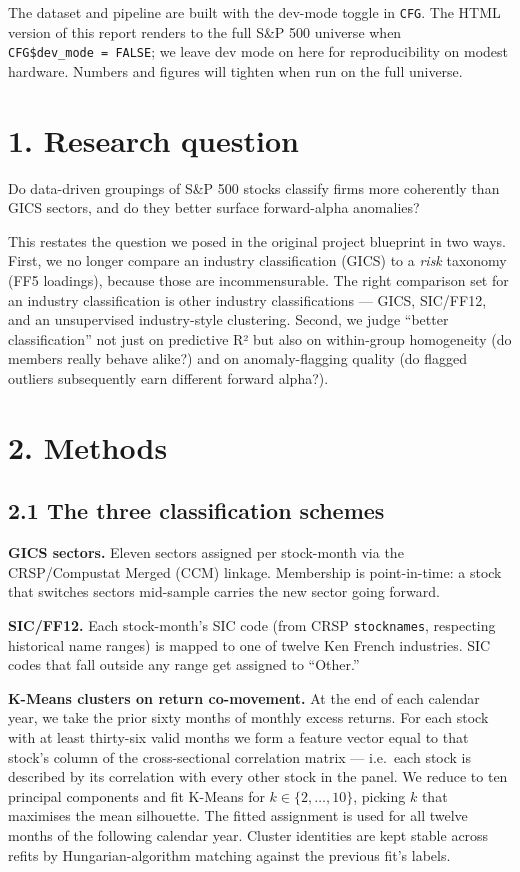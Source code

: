 \documentclass[
  letterpaper,
  DIV=11,
  numbers=noendperiod]{scrartcl}
\begin{document}
The dataset and pipeline are built with the dev-mode toggle in
\texttt{CFG}. The HTML version of this report renders to the full S\&P
500 universe when \texttt{CFG\$dev\_mode\ =\ FALSE}; we leave dev mode
on here for reproducibility on modest hardware. Numbers and figures will
tighten when run on the full universe.

\section{1. Research question}\label{research-question}

Do data-driven groupings of S\&P 500 stocks classify firms more
coherently than GICS sectors, and do they better surface forward-alpha
anomalies?

This restates the question we posed in the original project blueprint in
two ways. First, we no longer compare an industry classification (GICS)
to a \emph{risk} taxonomy (FF5 loadings), because those are
incommensurable. The right comparison set for an industry classification
is other industry classifications --- GICS, SIC/FF12, and an
unsupervised industry-style clustering. Second, we judge ``better
classification'' not just on predictive R² but also on within-group
homogeneity (do members really behave alike?) and on anomaly-flagging
quality (do flagged outliers subsequently earn different forward
alpha?).

\section{2. Methods}\label{methods}

\subsection{2.1 The three classification
schemes}\label{the-three-classification-schemes}

\textbf{GICS sectors.} Eleven sectors assigned per stock-month via the
CRSP/Compustat Merged (CCM) linkage. Membership is point-in-time: a
stock that switches sectors mid-sample carries the new sector going
forward.

\textbf{SIC/FF12.} Each stock-month's SIC code (from CRSP
\texttt{stocknames}, respecting historical name ranges) is mapped to one
of twelve Ken French industries. SIC codes that fall outside any range
get assigned to ``Other.''

\textbf{K-Means clusters on return co-movement.} At the end of each
calendar year, we take the prior sixty months of monthly excess returns.
For each stock with at least thirty-six valid months we form a feature
vector equal to that stock's column of the cross-sectional correlation
matrix --- i.e.~each stock is described by its correlation with every
other stock in the panel. We reduce to ten principal components and fit
K-Means for \(k \in \{2, \ldots, 10\}\), picking \(k\) that maximises
the mean silhouette. The fitted assignment is used for all twelve months
of the following calendar year. Cluster identities are kept stable
across refits by Hungarian-algorithm matching against the previous fit's
labels.
\end{document}

